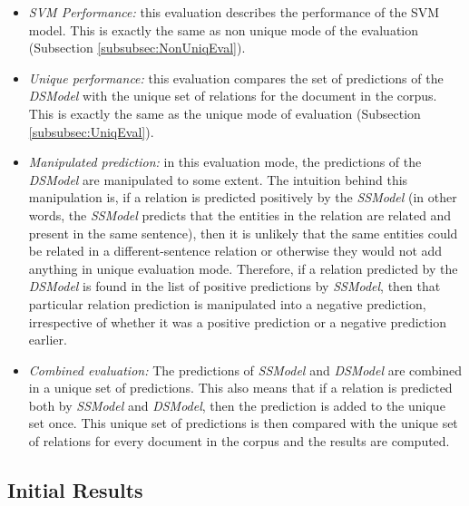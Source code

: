 \begin{itemize}

\item \textit{SVM Performance:} this evaluation describes the performance of the SVM model. This is exactly the same as non unique mode of the evaluation (Subsection \ref{subsubsec:NonUniqEval}).

\item \textit{Unique performance:} this evaluation compares the set of predictions of the \textit{DSModel} with the unique set of relations for the document in the corpus. This is exactly the same as the unique mode of evaluation (Subsection \ref{subsubsec:UniqEval}).

\item \textit{Manipulated prediction:} in this evaluation mode, the predictions of the \textit{DSModel} are manipulated to some extent. The intuition behind this manipulation is, if a relation is predicted positively by the \textit{SSModel} (in other words, the \textit{SSModel} predicts that the entities in the relation are related and present in the same sentence), then it is unlikely that the same entities could be related in a different-sentence relation or otherwise they would not add anything in unique evaluation mode. Therefore, if a relation predicted by the \textit{DSModel} is found in the list of positive predictions by \textit{SSModel}, then that particular relation prediction is manipulated into a negative prediction, irrespective of whether it was a positive prediction or a negative prediction earlier.

\item \textit{Combined evaluation:} The predictions of \textit{SSModel} and \textit{DSModel} are combined in a unique set of predictions. This also means that if a relation is predicted both by \textit{SSModel} and \textit{DSModel}, then the prediction is added to the unique set once. This unique set of predictions is then compared with the unique set of relations for every document in the corpus and the results are computed.

\end{itemize}

\subsection{Initial Results}

